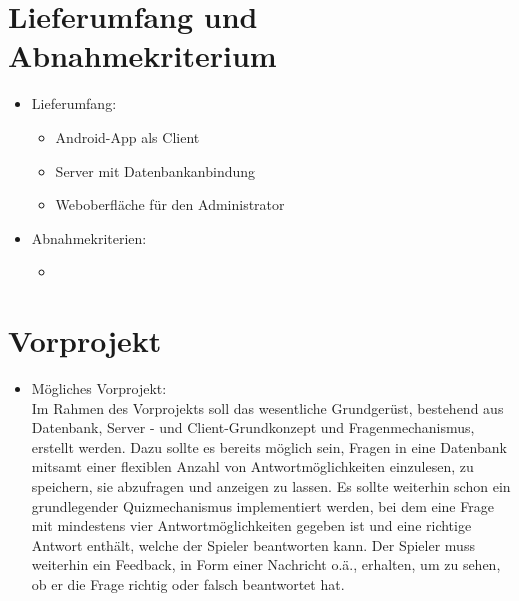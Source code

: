 \documentclass[11pt,a4paper]{scrreprt}
\begin{document}
\chapter{Lieferumfang und Abnahmekriterium}
\begin{itemize}
\item Lieferumfang:
	\begin{itemize}
	\item Android-App als Client
	\item Server mit Datenbankanbindung
	\item Weboberfläche für den Administrator
	
	\end{itemize}
\item Abnahmekriterien:
	\begin{itemize}
	\item 
	\end{itemize}
\end{itemize}

\chapter{Vorprojekt}
\begin{itemize}
\item Mögliches Vorprojekt: \\
Im Rahmen des Vorprojekts soll das wesentliche Grundgerüst, bestehend aus Datenbank, Server - und Client-Grundkonzept und Fragenmechanismus, erstellt werden. Dazu sollte es bereits möglich sein, Fragen in eine Datenbank mitsamt einer flexiblen Anzahl von Antwortmöglichkeiten einzulesen, zu speichern, sie abzufragen und anzeigen zu lassen. Es sollte weiterhin schon ein grundlegender Quizmechanismus implementiert werden, bei dem eine Frage mit mindestens vier Antwortmöglichkeiten gegeben ist und eine richtige Antwort enthält, welche der Spieler beantworten kann. Der Spieler muss weiterhin ein Feedback, in Form einer Nachricht o.ä., erhalten, um zu sehen, ob er die Frage richtig oder falsch beantwortet hat.
\end{itemize}
\end{document}
